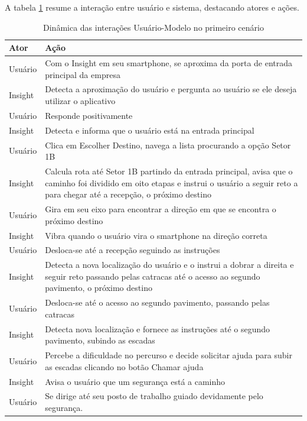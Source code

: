 \documentclass[twoside,english,brazilian]{UNISINOSartigo}
\begin{document}
A tabela \ref{tab:cenario1} resume a interação entre usuário e sistema, destacando atores e ações.

\begin{table}
	\caption{Dinâmica das interações Usuário-Modelo no primeiro cenário}
	\label{tab:cenario1}
	\centering%
	\begin{minipage}{1\textwidth}
		\begin{adjustbox}{max width=\textwidth}
			\begin{tabular}{ p{} | p{14cm} }
				\hline
			 	\textbf{Ator} & \textbf{Ação}\\
				\hline
Usuário & Com o Insight em seu smartphone, se aproxima da porta de entrada principal da empresa \\
Insight & Detecta a aproximação do usuário e pergunta ao usuário se ele deseja utilizar o aplicativo \\
Usuário & Responde positivamente \\
Insight & Detecta e informa que o usuário está na entrada principal \\
Usuário & Clica em Escolher Destino, navega a lista procurando a opção Setor 1B \\
Insight & Calcula rota até Setor 1B partindo da entrada principal, avisa que o caminho foi dividido em oito etapas e instrui o usuário a seguir reto a para chegar até a recepção, o próximo destino \\
Usuário & Gira em seu eixo para encontrar a direção em que se encontra o próximo destino \\
Insight & Vibra quando o usuário vira o smartphone na direção correta \\
Usuário & Desloca-se até a recepção seguindo as instruções \\
Insight & Detecta a nova localização do usuário e o instrui a dobrar a direita e seguir reto passando pelas catracas até o acesso ao segundo pavimento, o próximo destino \\
Usuário & Desloca-se até o acesso ao segundo pavimento, passando pelas catracas \\
Insight & Detecta nova localização e fornece as instruções até o segundo pavimento, subindo as escadas \\
Usuário & Percebe a dificuldade no percurso e decide solicitar ajuda para subir as escadas clicando no botão Chamar ajuda \\
Insight & Avisa o usuário que um segurança está a caminho \\
Usuário & Se dirige até seu posto de trabalho guiado devidamente pelo segurança. \\
				\hline
			\end{tabular}
		\end{adjustbox}
	\end{minipage}
\end{table}
\end{document}

